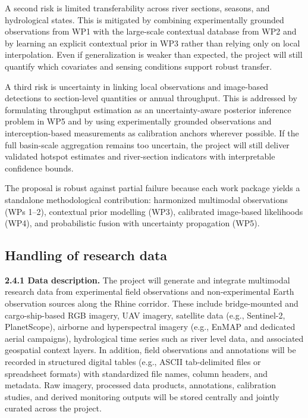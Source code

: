 \documentclass{scrartcl}
\begin{document}
A second risk is limited transferability across river sections, seasons, and hydrological states. This is mitigated by combining experimentally grounded observations from WP1 with the large-scale contextual database from WP2 and by learning an explicit contextual prior in WP3 rather than relying only on local interpolation. Even if generalization is weaker than expected, the project will still quantify which covariates and sensing conditions support robust transfer.

A third risk is uncertainty in linking local observations and image-based detections to section-level quantities or annual throughput. This is addressed by formulating throughput estimation as an uncertainty-aware posterior inference problem in WP5 and by using experimentally grounded observations and interception-based measurements as calibration anchors wherever possible. If the full basin-scale aggregation remains too uncertain, the project will still deliver validated hotspot estimates and river-section indicators with interpretable confidence bounds.

The proposal is robust against partial failure because each work package yields a standalone methodological contribution: harmonized multimodal observations (WPs 1--2), contextual prior modelling (WP3), calibrated image-based likelihoods (WP4), and probabilistic fusion with uncertainty propagation (WP5).

\subsection{Handling of research data}

\textbf{2.4.1 Data description.} The project will generate and integrate multimodal research data from experimental field observations and non-experimental Earth observation sources along the Rhine corridor. These include bridge-mounted and cargo-ship-based RGB imagery, UAV imagery, satellite data (e.g., Sentinel-2, PlanetScope), airborne and hyperspectral imagery (e.g., EnMAP and dedicated aerial campaigns), hydrological time series such as river level data, and associated geospatial context layers. In addition, field observations and annotations will be recorded in structured digital tables (e.g., ASCII tab-delimited files or spreadsheet formats) with standardized file names, column headers, and metadata. Raw imagery, processed data products, annotations, calibration studies, and derived monitoring outputs will be stored centrally and jointly curated across the project.
\end{document}
